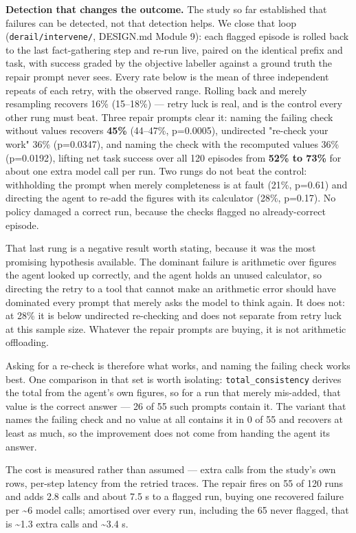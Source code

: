 \documentclass[11pt]{article}
\begin{document}
\textbf{Detection that changes the outcome.} The study so far established that failures can be detected, not that detection helps. We close that loop (\texttt{derail/\allowbreak{}intervene/\allowbreak{}}, DESIGN.md Module 9): each flagged episode is rolled back to the last fact-gathering step and re-run live, paired on the identical prefix and task, with success graded by the objective labeller against a ground truth the repair prompt never sees. Every rate below is the mean of three independent repeats of each retry, with the observed range. Rolling back and merely resampling recovers 16\% (15--18\%) --- retry luck is real, and is the control every other rung must beat. Three repair prompts clear it: naming the failing check without values recovers \textbf{45\%} (44--47\%, p=0.0005), undirected "re-check your work" 36\% (p=0.0347), and naming the check with the recomputed values 36\% (p=0.0192), lifting net task success over all 120 episodes from \textbf{52\% to 73\%} for about one extra model call per run. Two rungs do not beat the control: withholding the prompt when merely completeness is at fault (21\%, p=0.61) and directing the agent to re-add the figures with its calculator (28\%, p=0.17). No policy damaged a correct run, because the checks flagged no already-correct episode.


That last rung is a negative result worth stating, because it was the most promising hypothesis available. The dominant failure is arithmetic over figures the agent looked up correctly, and the agent holds an unused calculator, so directing the retry to a tool that cannot make an arithmetic error should have dominated every prompt that merely asks the model to think again. It does not: at 28\% it is below undirected re-checking and does not separate from retry luck at this sample size. Whatever the repair prompts are buying, it is not arithmetic offloading.


Asking for a re-check is therefore what works, and naming the failing check works best. One comparison in that set is worth isolating: \texttt{total\_\allowbreak{}consistency} derives the total from the agent's own figures, so for a run that merely mis-added, that value is the correct answer --- 26 of 55 such prompts contain it. The variant that names the failing check and no value at all contains it in 0 of 55 and recovers at least as much, so the improvement does not come from handing the agent its answer.


The cost is measured rather than assumed --- extra calls from the study's own rows, per-step latency from the retried traces. The repair fires on 55 of 120 runs and adds 2.8 calls and about 7.5 s to a flagged run, buying one recovered failure per \textasciitilde{}6 model calls; amortised over every run, including the 65 never flagged, that is \textasciitilde{}1.3 extra calls and \textasciitilde{}3.4 s.
\end{document}
